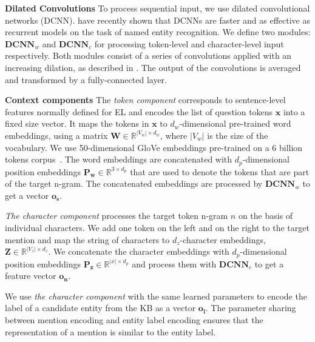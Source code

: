 \documentclass[11pt,a4paper]{article}
\begin{document}
\textbf{Dilated Convolutions} To process sequential input, we use dilated convolutional networks (DCNN). \citet{Strubell2017} have recently shown that DCNNs are faster and as effective as recurrent models on the task of named entity recognition. We define two modules: $\mathbf{DCNN}_w$ and $\mathbf{DCNN}_c$ for processing token-level and character-level input respectively. Both modules consist of a series of convolutions applied with an increasing dilation, as described in \citet{Strubell2017}. The output of the convolutions is averaged and transformed by a fully-connected layer.

\textbf{Context components} The \textit{token component} corresponds to sentence-level features normally defined for EL and encodes the list of question tokens $\mathbf{x}$ into a fixed size vector. It maps the tokens in $\mathbf{x}$ to $d_w$-dimensional pre-trained word embeddings, using a matrix $\mathbf{W} \in \mathbb{R}^{|V_w| \times d_w}$, where $|V_w|$ is the size of the vocabulary. We use 50-dimensional GloVe embeddings pre-trained on a 6 billion tokens corpus~\cite{Pennington2014}. 
The word embeddings are concatenated with $d_p$-dimensional position embeddings $\mathbf{P_w} \in \mathbb{R}^{3 \times d_p}$ that are used to denote the tokens that are part of the target n-gram. The concatenated embeddings are processed by $\mathbf{DCNN}_w$ to get a vector $\mathbf{o_s}$.

\textit{The character component} processes the target token n-gram $n$ on the basis of individual characters. We add one token on the left and on the right to the target mention and map the string of characters to $d_z$-character embeddings, $\mathbf{Z} \in \mathbb{R}^{|V_z| \times d_z}$. We concatenate the character embeddings with $d_p$-dimensional position embeddings $\mathbf{P_z} \in \mathbb{R}^{|x| \times d_p}$ and process them with $\mathbf{DCNN}_c$ to get a feature vector $\mathbf{o_n}$.

We use \textit{the character component} with the same learned parameters to encode the label of a candidate entity from the KB as a vector $\mathbf{o_l}$. The parameter sharing between mention encoding and entity label encoding ensures that the representation of a mention is similar to the entity label.
\end{document}

